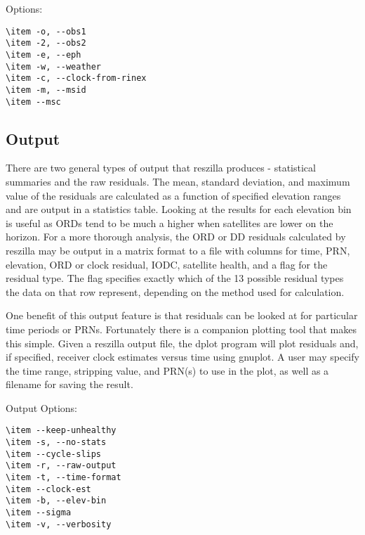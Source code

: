 \documentclass{article}
\begin{document}
Options:

\begin{verbatim}
\item -o, --obs1
\item -2, --obs2
\item -e, --eph
\item -w, --weather
\item -c, --clock-from-rinex
\item -m, --msid
\item --msc
\end{verbatim}

\subsection{Output}
There are two general types of output that reszilla produces -
statistical summaries and the raw residuals.  The mean, standard 
deviation, and maximum value of the residuals are calculated 
as a function of specified elevation ranges and are output in a 
statistics table. Looking at the results for each elevation bin 
is useful as ORDs tend to be much a higher when satellites are 
lower on the horizon. For a more thorough analysis, the ORD or DD 
residuals calculated by reszilla may be output in a matrix format 
to a file with columns for time, PRN, elevation, ORD or clock residual, 
IODC, satellite health, and a flag for the residual type.  The flag 
specifies exactly which of the 13 possible residual types the data 
on that row represent, depending on the method used for calculation. 

One benefit of this output feature is that residuals can be looked at 
for particular time periods or PRNs. Fortunately there is a companion 
plotting tool that makes this simple. Given a reszilla output file, 
the dplot program will plot residuals and, if specified, receiver clock 
estimates versus time using gnuplot. A user may specify the time 
range, stripping value, and PRN(s) to use in the plot, as well as a
filename for saving the result. 

Output Options:

\begin{verbatim}
\item --keep-unhealthy
\item -s, --no-stats
\item --cycle-slips
\item -r, --raw-output
\item -t, --time-format
\item --clock-est
\item -b, --elev-bin
\item --sigma
\item -v, --verbosity
\end{verbatim}
\end{document}
